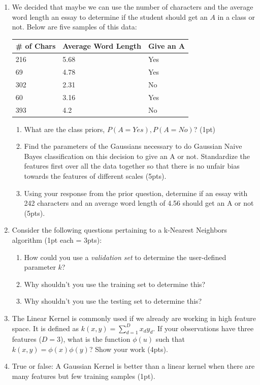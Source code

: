 \documentclass[12pt]{article}
\begin{document}
\begin{enumerate}
\item We decided that maybe we can use the number of characters and the average word length an essay to determine if the student should get an $A$ in a class or not.  Below are five samples of this data:
\begin{table}[h]
\begin{center}
\begin{tabular}{|l|l|l|}
\hline
\# of Chars & Average Word Length & Give an A\\
\hline
216 & 5.68 & Yes\\
69 & 4.78 & Yes\\
302 & 2.31 & No \\
60 & 3.16 & Yes \\
393 & 4.2 & No\\
\hline
\end{tabular}
\end{center}
\end{table}
\begin{enumerate}
\item What are the class priors, $P(A=Yes), P(A=No)$? (1pt)
\item Find the parameters of the Gaussians necessary to do Gaussian Naive Bayes classification on this decision to give an A or not.  Standardize the features first over all the data together so that there is no unfair bias towards the features of different scales (5pts).
\item Using your response from the prior question, determine if an essay with 242 characters and an average word length of 4.56 should get an A or not (5pts).
\end{enumerate}
\item Consider the following questions pertaining to a k-Nearest Neighbors algorithm (1pt each = 3pts):
\begin{enumerate}
\item How could you use a \emph{validation set} to determine the user-defined parameter $k$?
\item Why shouldn't you use the training set to determine this?
\item Why shouldn't you use the testing set to determine this?
\end{enumerate}
\item The Linear Kernel is commonly used if we already are working in high feature space.  It is defined as $k(x,y)=\sum_{d=1}^D x_d y_d$.  If your observations have three features ($D=3$), what is the function $\phi(u)$ such that $k(x,y)=\phi(x)\phi(y)$?  Show your work (4pts).
\item True or false:  A Gaussian Kernel is better than a linear kernel when there are many features but few training samples (1pt).
\end{enumerate}
\end{document}
